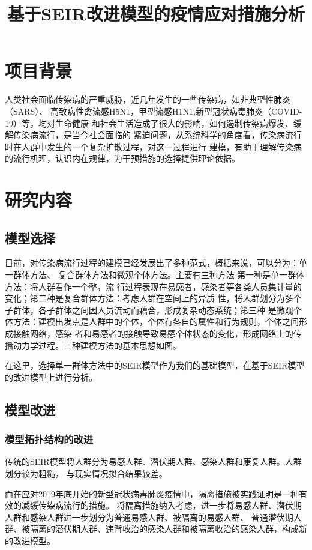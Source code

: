 \documentclass[withoutpreface,bwprint]{cumcmthesis}
\title{基于SEIR改进模型的疫情应对措施分析}
\begin{document}
\maketitle

\section{项目背景}
人类社会面临传染病的严重威胁，近几年发生的一些传染病，如非典型性肺炎（SARS）、
高致病性禽流感H5N1，甲型流感H1N1,新型冠状病毒肺炎（COVID-19）等，均对生命健康
和社会生活造成了很大的影响，如何遏制传染病爆发、缓解传染病流行，是当今社会面临的
紧迫问题，从系统科学的角度看，传染病流行时在人群中发生的一个复杂扩散过程，对这一过程进行
建模，有助于理解传染病的流行机理，认识内在规律，为干预措施的选择提供理论依据。

\section{研究内容}
\subsection{模型选择}
目前，对传染病流行过程的建模已经发展出了多种范式，概括来说，可以分为：单一群体方法、
复合群体方法和微观个体方法。主要有三种方法 第一种是单一群体方法：将人群看作一个整，流
行过程表现在易感者，感染者等各类人员集计量的变化；第二种是复合群体方法：考虑人群在空间上的异质
性，将人群划分为多个子群体，各子群体之间因人员流动而藕合，形成复杂动态系统；第三种
是微观个体方法：建模出发点是人群中的个体，个体有各自的属性和行为规则，个体之间形成接触网络，感染
者和易感者的接触导致易感个体状态的变化，形成网络上的传播动力学过程。三种建模方法的基本思想如图。
\par
在这里，选择单一群体方法中的SEIR模型作为我们的基础模型，在基于SEIR模型的改进模型上进行分析。
\subsection{模型改进}
\subsubsection{模型拓扑结构的改进}
传统的SEIR模型将人群分为易感人群、潜伏期人群、感染人群和康复人群。人群划分较为粗糙，
与现实情况拟合结果较差。

而在应对2019年底开始的新型冠状病毒肺炎疫情中，隔离措施被实践证明是一种有效的减缓传染病流行的措施。
将隔离措施纳入考虑，进一步将易感人群、潜伏期人群和感染人群进一步划分为普通易感人群、被隔离的易感人群、
普通潜伏期人群、被隔离的潜伏期人群、违背收治的感染人群和被隔离收治的感染人群，构成新的改进模型。
\end{document}
